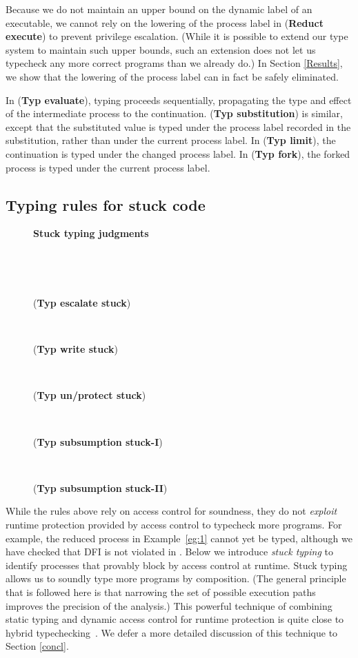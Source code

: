 \documentclass{sigplanconf}
\def\upbracketfill{}
\def\downbracketfill{}
\newcommand{\cenvvv}[3]{\vspace{0.8mm}
\begin{flushleft}
\parbox{8.4cm}{{\bf #1} }
\\
\parbox{8.4cm}{\downbracketfill}
\\
\vspace{-0.2cm}
\end{flushleft}
#3
\begin{flushleft}
\parbox{8.4cm}{\upbracketfill}
\end{flushleft}}
\newcommand{\labp}{\mathsf P}
\newcommand{\trule}[1]{(\textbf{Typ #1})}
\newcommand{\rrule}[1]{\textbf{Reduct #1}}
\begin{document}
Because we do not maintain an upper bound on the dynamic label of an executable, we cannot rely on the lowering of the process label in (\rrule{execute}) to prevent privilege escalation. (While it is possible to extend our type system to maintain such upper bounds, such an extension does not let us typecheck any more correct programs than we already do.) In Section \ref{Results}, we show that the lowering of the process label can in fact be safely
eliminated. 


In \trule{evaluate}, typing proceeds sequentially, propagating the type and effect of the intermediate process to the continuation.
\trule{substitution} is similar, except that the substituted value is typed under the process label recorded in the
substitution, rather than under the current process label. In \trule{limit}, the continuation is typed under the
changed process label. In \trule{fork}, the forked process is typed under the current process label.

\subsection{Typing rules for stuck code}\label{stuck}

\begin{figure}
\cenvvv{Stuck typing judgments}{\Gamma \vdash_{\labp} a : \mathbf{Stuck}}{
({\bf Typ escalate stuck})\vspace{-2mm}

~

({\bf Typ write stuck})\vspace{-1mm}

~

({\bf Typ un/protect stuck})\vspace{0mm}

~

({\bf Typ subsumption stuck-I})\vspace{-1mm}

~

({\bf Typ subsumption stuck-II})\vspace{0mm}

}
\end{figure}

While the rules above rely on access control for soundness, they do not \emph{exploit} runtime protection provided by access control to typecheck more programs. For example, the reduced process 
in Example~\ref{eg:1} cannot yet be typed, although we have checked that DFI is not violated in . Below we introduce \emph{stuck typing} to identify processes that provably block by access control at runtime. Stuck typing allows us to soundly type more programs by composition. 
(The general principle that is followed here is that narrowing the set of possible execution paths improves the precision of the analysis.) 
This powerful technique of combining static typing and dynamic access control for runtime protection is quite close to hybrid typechecking~\cite{hybtc}. We defer a more detailed discussion of this technique to Section \ref{concl}.
\end{document}
